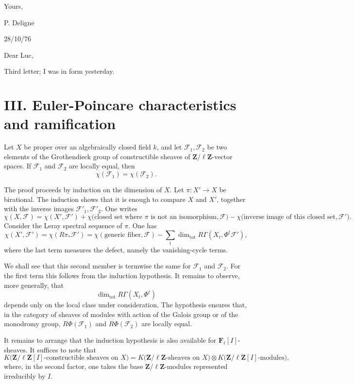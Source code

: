 \documentclass[11pt]{article}
\newcommand{\F}{\mathcal F}
\newcommand{\Zell}{\mathbf Z/\ell\mathbf Z}
\newcommand{\Fell}{\mathbf F_\ell}
\DeclareMathOperator{\Tot}{tot}
\begin{document}
Yours,

\hspace{2em}P. Deligne

\newpage

\begin{flushright}
28/10/76
\end{flushright}

Dear Luc,

Third letter; I was in form yesterday.

\section*{III. Euler-Poincare characteristics and ramification}

Let \(X\) be proper over an algebraically closed field \(k\), and let \(\F_1,\F_2\) be two elements of the Grothendieck group of constructible sheaves of \(\Zell\)-vector spaces. If \(\F_1\) and \(\F_2\) are locally equal, then
\[
  \chi(\F_1)=\chi(\F_2).
\]

The proof proceeds by induction on the dimension of \(X\). Let \(\pi:X'\to X\) be birational. The induction shows that it is enough to compare \(X\) and \(X'\), together with the inverse images \(\F'_1,\F'_2\). One writes
\[
  \chi(X,\F)=\chi(X',\F')+
  \chi\bigl(\text{closed set where }\pi\text{ is not an isomorphism},\F\bigr)
  -\chi\bigl(\text{inverse image of this closed set},\F'\bigr).
\]
Consider the Leray spectral sequence of \(\pi\). One has
\[
  \chi(X',\F')
  =\chi(R\pi_*\F')
  =\chi(\text{generic fiber},\F)
   -\sum_t \dim_{\Tot}R\Gamma(X_t,\Phi^t\F'),
\]
where the last term measures the defect, namely the vanishing-cycle terms.

We shall see that this second member is termwise the same for \(\F_1\) and \(\F_2\). For the first term this follows from the induction hypothesis. It remains to observe, more generally, that
\[
  \dim_{\Tot} R\Gamma(X_t,\Phi^t)
\tag{1}
\]
depends only on the local class under consideration. The hypothesis ensures that, in the category of sheaves of modules with action of the Galois group or of the monodromy group, \(R\Phi(\F_1)\) and \(R\Phi(\F_2)\) are locally equal.

It remains to arrange that the induction hypothesis is also available for \(\Fell[I]\)-sheaves. It suffices to note that
\[
K\bigl(\Zell[I]\text{-constructible sheaves on }X\bigr)
=
K\bigl(\Zell\text{-sheaves on }X\bigr)
\otimes
K\bigl(\Zell[I]\text{-modules}\bigr),
\]
where, in the second factor, one takes the base \(\Zell\)-modules represented irreducibly by \(I\).
\end{document}
